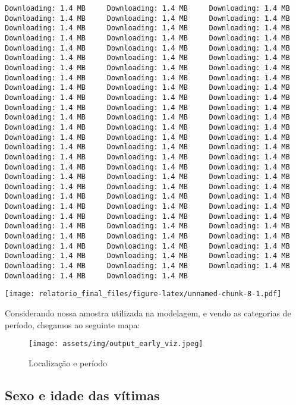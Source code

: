\documentclass[
  12pt,
  portuguese,
]{report}
\begin{document}
\begin{verbatim}
Downloading: 1.4 MB     Downloading: 1.4 MB     Downloading: 1.4 MB     Downloading: 1.4 MB     Downloading: 1.4 MB     Downloading: 1.4 MB     Downloading: 1.4 MB     Downloading: 1.4 MB     Downloading: 1.4 MB     Downloading: 1.4 MB     Downloading: 1.4 MB     Downloading: 1.4 MB     Downloading: 1.4 MB     Downloading: 1.4 MB     Downloading: 1.4 MB     Downloading: 1.4 MB     Downloading: 1.4 MB     Downloading: 1.4 MB     Downloading: 1.4 MB     Downloading: 1.4 MB     Downloading: 1.4 MB     Downloading: 1.4 MB     Downloading: 1.4 MB     Downloading: 1.4 MB     Downloading: 1.4 MB     Downloading: 1.4 MB     Downloading: 1.4 MB     Downloading: 1.4 MB     Downloading: 1.4 MB     Downloading: 1.4 MB     Downloading: 1.4 MB     Downloading: 1.4 MB     Downloading: 1.4 MB     Downloading: 1.4 MB     Downloading: 1.4 MB     Downloading: 1.4 MB     Downloading: 1.4 MB     Downloading: 1.4 MB     Downloading: 1.4 MB     Downloading: 1.4 MB     Downloading: 1.4 MB     Downloading: 1.4 MB     Downloading: 1.4 MB     Downloading: 1.4 MB     Downloading: 1.4 MB     Downloading: 1.4 MB     Downloading: 1.4 MB     Downloading: 1.4 MB     Downloading: 1.4 MB     Downloading: 1.4 MB     Downloading: 1.4 MB     Downloading: 1.4 MB     Downloading: 1.4 MB     Downloading: 1.4 MB     Downloading: 1.4 MB     Downloading: 1.4 MB     Downloading: 1.4 MB     Downloading: 1.4 MB     Downloading: 1.4 MB     Downloading: 1.4 MB     Downloading: 1.4 MB     Downloading: 1.4 MB     Downloading: 1.4 MB     Downloading: 1.4 MB     Downloading: 1.4 MB     Downloading: 1.4 MB     Downloading: 1.4 MB     Downloading: 1.4 MB     Downloading: 1.4 MB     Downloading: 1.4 MB     Downloading: 1.4 MB     Downloading: 1.4 MB     Downloading: 1.4 MB     Downloading: 1.4 MB     Downloading: 1.4 MB     Downloading: 1.4 MB     Downloading: 1.4 MB     Downloading: 1.4 MB     Downloading: 1.4 MB     Downloading: 1.4 MB     Downloading: 1.4 MB     Downloading: 1.4 MB     Downloading: 1.4 MB
\end{verbatim}

\texttt{[image: relatorio\_final\_files/figure-latex/unnamed-chunk-8-1.pdf]}

Considerando nossa amostra utilizada na modelagem, e vendo as categorias de período, chegamos ao seguinte mapa:

\begin{figure}
\centering
\texttt{[image: assets/img/output\_early\_viz.jpeg]}
\caption{Localização e período}
\end{figure}

\hypertarget{sexo-e-idade-das-vuxedtimas}{%
\subsection{Sexo e idade das vítimas}\label{sexo-e-idade-das-vuxedtimas}}
\end{document}
